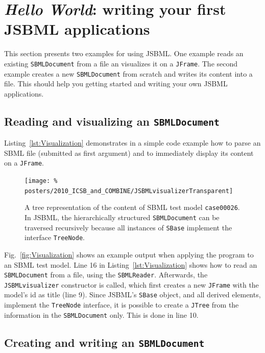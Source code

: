 \section{\emph{Hello World}: writing your first JSBML applications}

This section presents two examples for using JSBML. One example reads an
existing \texttt{SBMLDocument} from a file an visualizes it on a \texttt{JFrame}.
The second example creates a new \texttt{SBMLDocument} from scratch and writes
its content into a file. This should help you getting started and writing your
own JSBML applications.

\subsection{Reading and visualizing an \texttt{SBMLDocument}}

Listing~\vref{lst:Visualization} demonstrates in a simple code example how to
parse an SBML file (submitted as first argument) and to
immediately display its content on a \texttt{JFrame}.
%

\begin{figure}
\texttt{[image: \%
posters/2010\_ICSB\_and\_COMBINE/JSBMLvisualizerTransparent]}
\caption[Tree representation of an SBML file]{A tree representation of the
content of SBML test model \texttt{case00026}. In JSBML, the hierarchically
structured \texttt{SBMLDocument} can be traversed recursively because all
instances of \texttt{SBase} implement the interface \texttt{TreeNode}.}
\label{fig:Visualization}
\end{figure}
Fig.~\vref{fig:Visualization} shows an example output when applying the program
to an SBML test model.
%
Line 16 in Listing~\vref{lst:Visualization} shows how to read an
\texttt{SBMLDocument} from a file, using the \texttt{SBMLReader}. Afterwards,
the \texttt{JSBMLvisualizer} constructor is called, which first creates a new
\texttt{JFrame} with the model's id as title (line 9). Since JSBML's
\texttt{SBase} object, and all derived elements, implement the \texttt{TreeNode}
interface, it is possible to create a \texttt{JTree} from the information in the
\texttt{SBMLDocument} only. This is done in line 10.

\subsection{Creating and writing an \texttt{SBMLDocument}}

